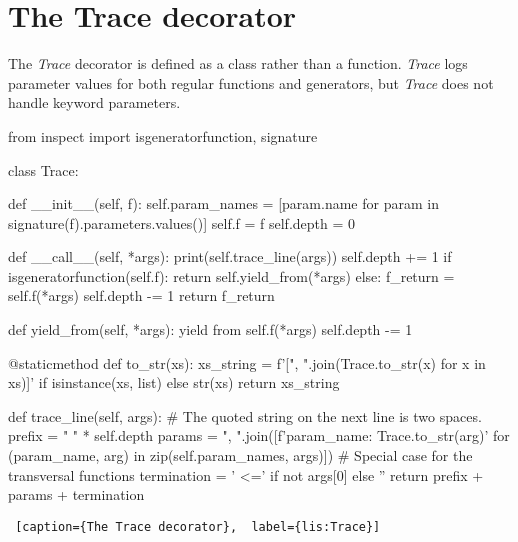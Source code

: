 \section{The Trace decorator}\label{app:Trace}

The \textit{Trace} decorator is defined as a class rather than a function. \textit{Trace} logs parameter values for both regular functions and generators, but \textit{Trace} does not handle keyword parameters.

\begin{minipage}{\linewidth}  \hrulefill
\begin{python}[numbers=left]
from inspect import isgeneratorfunction, signature

class Trace:

    def __init__(self, f):
        self.param_names = [param.name for param in signature(f).parameters.values()]
        self.f = f
        self.depth = 0

    def __call__(self, *args):
        print(self.trace_line(args))
        self.depth += 1
        if isgeneratorfunction(self.f):
            return self.yield_from(*args)
        else:
            f_return = self.f(*args)
            self.depth -= 1
            return f_return

    def yield_from(self, *args):
        yield from self.f(*args)
        self.depth -= 1

    @staticmethod
    def to_str(xs):
        xs_string = f'[{", ".join(Trace.to_str(x) for x in xs)}]' if isinstance(xs, list) else str(xs)
        return xs_string

    def trace_line(self, args):
        # The quoted string on the next line is two spaces.
        prefix = "  " * self.depth
        params = ", ".join([f'{param_name}: {Trace.to_str(arg)}'
                            for (param_name, arg) in zip(self.param_names, args)])
        # Special case for the transversal functions
        termination = ' <=' if not args[0] else ''
        return prefix + params + termination
\end{python}

\begin{lstlisting} [caption={The Trace decorator},  label={lis:Trace}]
\end{lstlisting}
\end{minipage}
